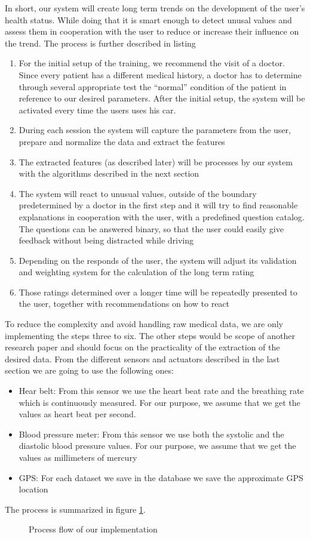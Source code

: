 In short, our system will create long term trends on the development of the user's health status. While doing that it is smart enough to detect unusal values and assess them in cooperation with the user to reduce or increase their influence on the trend.
The process is further described in listing
\begin{enumerate}
	\item For the initial setup of the training, we recommend the visit of a doctor. Since every patient has a different medical history, a doctor has to determine through several appropriate test the ``normal'' condition of the patient in reference to our desired parameters. After the initial setup, the system will be activated every time the users uses his car.
	\item During each session the system will capture the parameters from the user, prepare and normalize the data and extract the features
	\item The extracted features (as described later) will be processes by our system with the algorithms described in the next section
	\item The system will react to unusual values, outside of the boundary predetermined by a doctor in the first step and it will try to find reasonable explanations in cooperation with the user, with a predefined question catalog. The questions can be answered binary, so that the user could easily give feedback without being distracted while driving 
	\item Depending on the responds of the user, the system will adjust its validation and weighting system for the calculation of the long term rating
	\item Those ratings determined over a longer time will be repeatedly presented to the user, together with recommendations on how to react 
\end{enumerate}

To reduce the complexity and avoid handling raw medical data, we are only implementing the steps three to six. The other steps would be scope of another research paper and should focus on the practicality of the extraction of the desired data.
From the different sensors and actuators described in the last section we are going to use the following ones:
\begin{itemize}
	\item Hear belt: From this sensor we use the heart beat rate and the breathing rate which is continuously measured. For our purpose, we assume that we get the values as heart beat per second.
	\item Blood pressure meter: From this sensor we use both the systolic and the diastolic blood pressure values. For our purpose, we assume that we get the values as millimeters of mercury
	\item GPS: For each dataset we save in the database we save the approximate GPS location
\end{itemize}
The process is summarized in figure \ref{fig:flow}.
\begin{figure}
	\caption{Process flow of our implementation}
	\label{fig:flow}
\end{figure}

